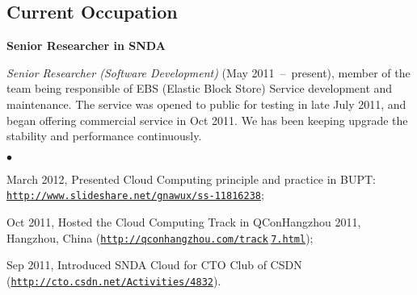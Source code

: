 \documentclass[a4paper,margin,line]{res}
\newenvironment{list1}{
  \begin{list}{\ding{113}}{%
      \setlength{\itemsep}{0in}
      \setlength{\parsep}{0in} \setlength{\parskip}{0in}
      \setlength{\topsep}{0in} \setlength{\partopsep}{0in} 
      \setlength{\leftmargin}{0.17in}}}{\end{list}}
\newenvironment{list2}{
  \begin{list}{$\bullet$}{%
      \setlength{\itemsep}{0in}
      \setlength{\parsep}{0in} \setlength{\parskip}{0in}
      \setlength{\topsep}{0in} \setlength{\partopsep}{0in} 
      \setlength{\leftmargin}{0.2in}}}{\end{list}}
\newcommand{\http}{http:/\hspace{-0.3ex}/}
\newcommand{\hindent}{\mbox{\hspace{8ex}}}
\begin{document}
\begin{resume}
\section{\sc Current Occupation}
\textbf{Senior Researcher in SNDA}\\
\vspace*{-.1in}
\begin{list1}
\item[] \emph{Senior Researcher (Software Development)}\/ (May 2011~--~present), member of the team being responsible of EBS (Elastic Block Store) Service development and maintenance. The service was opened to public for testing in late July 2011, and began offering commercial service in Oct 2011. We has been keeping upgrade the stability and performance continuously.  
\begin{list2}
\vspace*{.05in}
\item March 2012, Presented Cloud Computing principle and practice in BUPT: \\ \hindent\href{http://www.slideshare.net/gnawux/ss-11816238}{\tt\http{}www.slideshare.net/gnawux/ss-11816238};
\item Oct 2011, Hosted the Cloud Computing Track in QConHangzhou 2011, Hangzhou, China (\href{http://qconhangzhou.com/track_7.html}{\tt\http{}qconhangzhou.com/track$\underline{}$7.html});
\item Sep 2011, Introduced SNDA Cloud for CTO Club of CSDN \\(\href{http://cto.csdn.net/Activities/4832}{\tt\http{}cto.csdn.net/Activities/4832}).
\end{list2}
\end{list1}


\end{resume}
\end{document}
